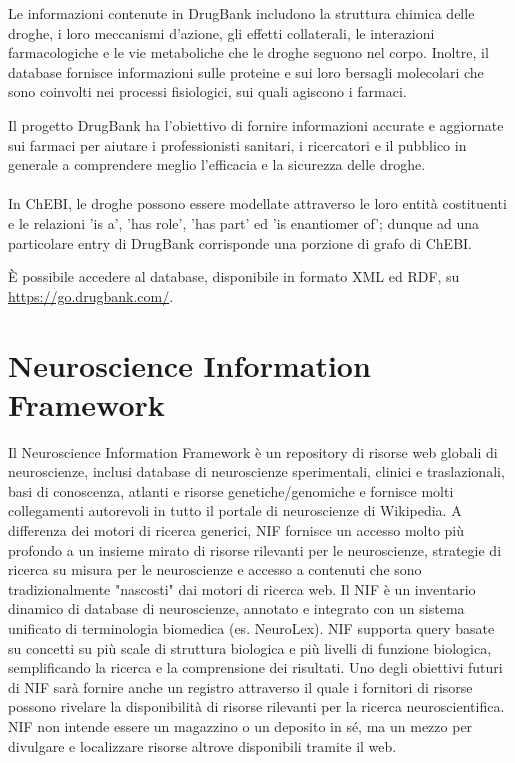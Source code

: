 \documentclass[12pt,a4paper,openright,twoside]{book}
\begin{document}
Le informazioni contenute in DrugBank includono la struttura chimica delle droghe, i loro meccanismi d'azione, gli effetti collaterali, le interazioni farmacologiche e le vie metaboliche che le droghe seguono nel corpo. Inoltre, il database fornisce informazioni sulle proteine e sui loro bersagli molecolari che sono coinvolti nei processi fisiologici, sui quali agiscono i farmaci.

Il progetto DrugBank ha l'obiettivo di fornire informazioni accurate e aggiornate sui farmaci per aiutare i professionisti sanitari, i ricercatori e il pubblico in generale a comprendere meglio l'efficacia e la sicurezza delle droghe.

\paragraph{} In ChEBI, le droghe possono essere modellate attraverso le loro entità costituenti e le relazioni 'is a', 'has role', 'has part' ed 'is enantiomer of';
dunque ad una particolare entry di DrugBank corrisponde una porzione di grafo di ChEBI.

È possibile accedere al database, disponibile in formato XML ed RDF, su \url{https://go.drugbank.com/}.

\section{Neuroscience Information Framework}
Il Neuroscience Information Framework è un repository di risorse web globali di neuroscienze, inclusi database di neuroscienze sperimentali, clinici e traslazionali, basi di conoscenza, atlanti e risorse genetiche/genomiche e fornisce molti collegamenti autorevoli in tutto il portale di neuroscienze di Wikipedia.
A differenza dei motori di ricerca generici, NIF fornisce un accesso molto più profondo a un insieme mirato di risorse rilevanti per le neuroscienze, strategie di ricerca su misura per le neuroscienze e accesso a contenuti che sono tradizionalmente "nascosti" dai motori di ricerca web.
Il NIF è un inventario dinamico di database di neuroscienze, annotato e integrato con un sistema unificato di terminologia biomedica (es. NeuroLex).
NIF supporta query basate su concetti su più scale di struttura biologica e più livelli di funzione biologica, semplificando la ricerca e la comprensione dei risultati.
Uno degli obiettivi futuri di NIF sarà fornire anche un registro attraverso il quale i fornitori di risorse possono rivelare la disponibilità di risorse rilevanti per la ricerca neuroscientifica. NIF non intende essere un magazzino o un deposito in sé, ma un mezzo per divulgare e localizzare risorse altrove disponibili tramite il web.
\end{document}
